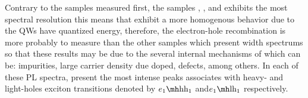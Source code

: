 Contrary to the samples measured first, the samples , , and  exhibits the most spectral resolution this means that exhibit a more homogenous behavior  due to the QWs have quantized energy, therefore, the electron-hole recombination is more probably to measure than the other samples which present width spectrums so that these results may be due to the several internal mechanisms of which can be: impurities, large carrier density due doped,  defects, among others\cite{khmissi2010effectcarriers,kundrotas2005excitonic}. In each of these PL spectra,  present the most intense peaks associates with heavy- and light-holes exciton transitions denoted by $\thh{1}{1}$ and$\tlh{1}{1}$ respectively.


